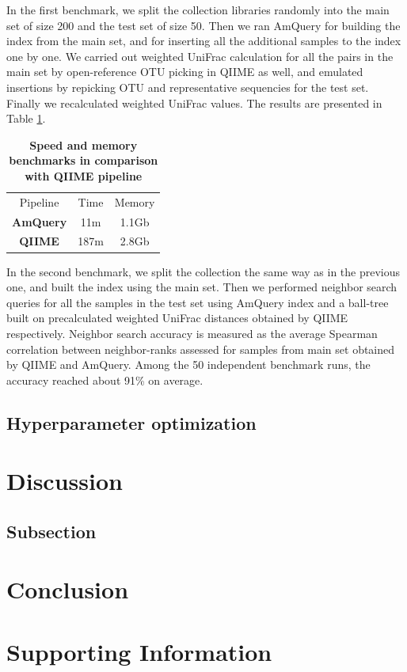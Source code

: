 \documentclass[10pt,letterpaper]{article}
\newlength\savedwidth
\newcommand\thickhline{\noalign{\global\savedwidth\arrayrulewidth\global\arrayrulewidth 2pt}%
\hline
\noalign{\global\arrayrulewidth\savedwidth}}
\begin{document}
	In the first benchmark, we split the collection libraries randomly into the main 
	set of size 200 and the test set of size 50. Then we ran AmQuery for building 
	the index from the main set, and for inserting all the additional samples to the 
	index one by one. 
	We carried out weighted UniFrac calculation for all the pairs in the main set by 
	open-reference OTU picking in QIIME as well, and emulated insertions by repicking
	OTU and representative sequencies for the test set. Finally we recalculated 
	weighted UniFrac values. The results are presented in Table \ref{tab:benchmark}.

	\begin{table}[!ht]
		\centering		
		\caption{
		{\bf Speed and memory benchmarks in comparison with QIIME pipeline}}
		\begin{tabular}{c | c c} \hline
			{Pipeline} & Time & Memory \\ \thickhline
			{\bf AmQuery} & 11m & 1.1Gb \\ \hline
			{\bf QIIME} & 187m & 2.8Gb \\ \hline
		\end{tabular}
		\label{tab:benchmark}
	\end{table}

	In the second benchmark, we split the collection the same way as in the previous one, 
	and built the index using the main set. Then we performed neighbor search queries for 
	all the samples in the test set using AmQuery index and a ball-tree built on precalculated
	weighted UniFrac distances obtained by QIIME respectively.
	Neighbor search accuracy is measured as the average Spearman correlation
	between neighbor-ranks assessed for samples from main set obtained by QIIME and AmQuery.
	Among the 50 independent benchmark runs, the accuracy reached about 91\% on average.

	\subsection*{Hyperparameter optimization}
			
\section*{Discussion}
	
	\subsection*{Subsection}
		
\section*{Conclusion}
	
\section*{Supporting Information}

\nolinenumbers


\end{document}
